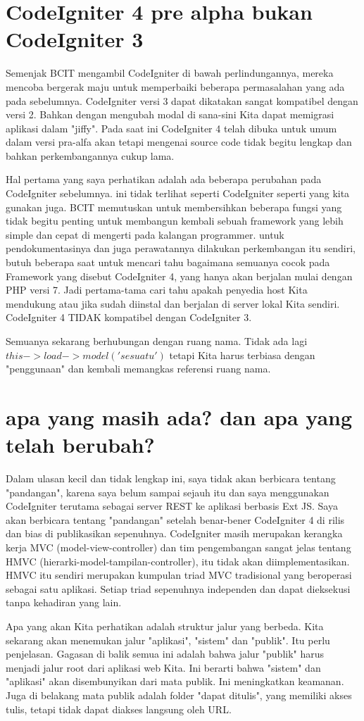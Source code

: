 \section{CodeIgniter 4 pre alpha bukan CodeIgniter 3}
Semenjak BCIT mengambil CodeIgniter di bawah perlindungannya, mereka mencoba bergerak maju untuk memperbaiki beberapa permasalahan yang ada pada sebelumnya. CodeIgniter versi 3 dapat dikatakan sangat kompatibel dengan versi 2. Bahkan dengan mengubah modal di sana-sini Kita dapat memigrasi aplikasi dalam "jiffy". Pada saat ini CodeIgniter 4 telah dibuka untuk umum dalam versi pra-alfa akan tetapi mengenai source code tidak begitu lengkap dan bahkan perkembangannya cukup lama. 
\par
Hal pertama yang saya perhatikan adalah ada beberapa perubahan pada CodeIgniter sebelumnya. ini tidak terlihat seperti CodeIgniter seperti yang kita gunakan juga. BCIT memutuskan untuk membersihkan beberapa fungsi yang tidak begitu penting untuk membangun kembali sebuah framework yang lebih simple dan cepat di mengerti pada kalangan programmer. untuk pendokumentasinya dan juga perawatannya dilakukan perkembangan itu sendiri, butuh beberapa saat untuk mencari tahu bagaimana semuanya cocok pada Framework yang disebut CodeIgniter 4, yang hanya akan berjalan mulai dengan PHP versi 7. Jadi pertama-tama cari tahu apakah penyedia host Kita mendukung atau jika sudah diinstal dan berjalan di server lokal Kita sendiri. CodeIgniter 4 TIDAK kompatibel dengan CodeIgniter 3.
\par
Semuanya sekarang berhubungan dengan ruang nama. Tidak ada lagi $ this-> load-> model ('sesuatu')$  tetapi Kita harus terbiasa dengan "penggunaan" dan kembali memangkas referensi ruang nama.

\section{apa yang masih ada? dan apa yang telah berubah?}
Dalam ulasan kecil dan tidak lengkap ini, saya tidak akan berbicara tentang "pandangan", karena saya belum sampai sejauh itu dan saya menggunakan CodeIgniter terutama sebagai server REST ke aplikasi berbasis Ext JS. Saya akan berbicara tentang "pandangan" setelah benar-bener CodeIgniter 4 di rilis dan bias di publikasikan sepenuhnya.
CodeIgniter masih merupakan kerangka kerja MVC (model-view-controller) dan tim pengembangan sangat jelas tentang HMVC (hierarki-model-tampilan-controller), itu tidak akan diimplementasikan. HMVC itu sendiri merupakan kumpulan triad MVC tradisional yang beroperasi sebagai satu aplikasi. Setiap triad sepenuhnya independen dan dapat dieksekusi tanpa kehadiran yang lain.
\par
Apa yang akan Kita perhatikan adalah struktur jalur yang berbeda. Kita sekarang akan menemukan jalur "aplikasi", "sistem" dan "publik". Itu perlu penjelasan. Gagasan di balik semua ini adalah bahwa jalur "publik" harus menjadi jalur root dari aplikasi web Kita. Ini berarti bahwa "sistem" dan "aplikasi" akan disembunyikan dari mata publik. Ini meningkatkan keamanan. Juga di belakang mata publik adalah folder "dapat ditulis", yang memiliki akses tulis, tetapi tidak dapat diakses langsung oleh URL.

